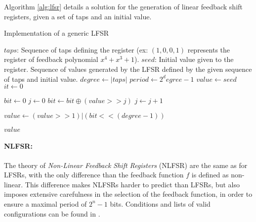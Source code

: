 \documentclass{llncs}
\begin{document}
Algorithm \ref{alg:lfsr} details a solution for the generation of linear feedback shift registers, given a set of taps and an initial value.

\begin{algorithm}[ht]
  \caption{Implementation of a generic LFSR}\label{alg:lfsr}
  \begin{algorithmic}[1]
    \Require
      \Statex $taps$: Sequence of taps defining the register (ex: $(1, 0, 0, 1)$ represents the register of feedback polynomial $x^4 + x^3 + 1$).
      \Statex $seed$: Initial value given to the register.
    \Ensure
      \Statex Sequence of values generated by the LFSR defined by the given sequence of taps and initial value.
    \Statex
    \State $degree \gets |taps|$ 
    \State $period \gets 2^degree - 1$ 
    \State $value \gets seed$ 
    \State $it \gets 0$
    
        \State $bit \gets 0$
        \State $j \gets 0$
            	\State $bit \gets bit \oplus (value >> j)$ 
            \EndIf
            \State $j \gets j+1$
    	\EndFor
        
        \State $value \gets (value >> 1) | (bit << (degree-1))$
        
        \Return $value$ 
    \EndWhile
  \end{algorithmic}
\end{algorithm}


\paragraph{NLFSR:}

The theory of \emph{Non-Linear Feedback Shift Registers} (NLFSR) are the same as for LFSRs, with the only difference than the feedback function $f$ is defined as non-linear\cite{joux}. This difference makes NLFSRs harder to predict than LFSRs, but also imposes extensive carefulness in the selection of the feedback function, in order to ensure a maximal period of $2^n-1$ bits. Conditions and lists of valid configurations can be found in \cite{dubro}.
\end{document}
